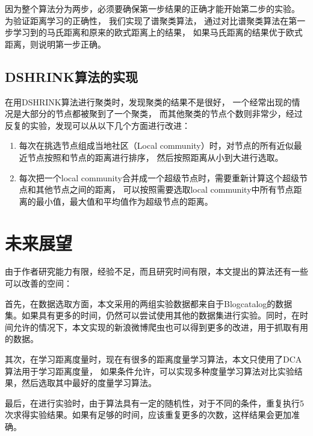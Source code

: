 因为整个算法分为两步，必须要确保第一步结果的正确才能开始第二步的实验。
为验证距离学习的正确性，
我们实现了谱聚类算法，
通过对比谱聚类算法在第一步学习到的马氏距离和原来的欧式距离上的结果，
如果马氏距离的结果优于欧式距离，则说明第一步正确。

\subsection{DSHRINK算法的实现}

在用DSHRINK算法进行聚类时，发现聚类的结果不是很好，
一个经常出现的情况是大部分的节点都被聚到了一个聚类，
而其他聚类的节点个数则非常少，经过反复的实验，发现可以从以下几个方面进行改进：

\begin{enumerate}
\item 每次在挑选节点组成当地社区（Local community）时，对节点的所有近似最近节点按照和节点的距离进行排序，
然后按照距离从小到大进行选取。
\item 每次把一个local community合并成一个超级节点时，需要重新计算这个超级节点和其他节点之间的距离，
可以按照需要选取local community中所有节点距离的最小值，最大值和平均值作为超级节点的距离。
\end{enumerate}

\section{未来展望}

由于作者研究能力有限，经验不足，而且研究时间有限，本文提出的算法还有一些可以改善的空间：

首先，在数据选取方面，本文采用的两组实验数据都来自于Blogcatalog的数据集。如果具有更多的时间，仍然可以尝试使用其他的数据集进行实验。同时，在时间允许的情况下，本文实现的新浪微博爬虫也可以得到更多的改进，用于抓取有用的数据。

其次，在学习距离度量时，现在有很多的距离度量学习算法，本文只使用了DCA算法用于学习距离度量，
如果条件允许，可以实现多种度量学习算法对比实验结果，然后选取其中最好的度量学习算法。

最后，在进行实验时，由于算法具有一定的随机性，对于不同的条件，重复执行5次求得实验结果。如果有足够的时间，应该重复更多的次数，这样结果会更加准确。
